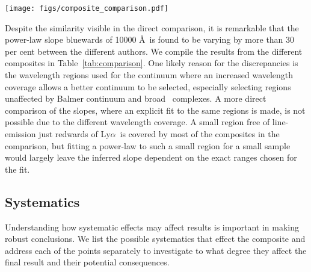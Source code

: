 \documentclass{aa}    %
\newcommand{\figlabel}[1]{\label{fig:#1}}
\newcommand{\Tab}[1]{Table~\ref{tab:#1}}
\newcommand{\tab}[1]{\Tab{#1}}
\newcommand{\sectlabel}[1]{\label{sect:#1}}
\newcommand{\lya}{Ly$\alpha$}
\newcommand{\feii}{\ion{Fe}{ii}}
\begin{document}
 \begin{figure*}[t!]
   \centering
   \texttt{[image: figs/composite\_comparison.pdf]}
   \caption[]{Comparison of different composites. The composites by
     \citet{Lusso2015, VandenBerk2001, Telfer2002, Francis1991} are
     normalized to the X-shooter composite at $\sim 1450$ \AA~and the
     composite by \citet{Glikman2006} is normalized to ours at $\sim
     3850$ \AA. Significant differences are visible blueward of
     \lya~due to differing IGM correction methods. Above 5000 \AA~
     significant host galaxy contamination is visible in the composite
     by \citet{VandenBerk2001}. Overplot in blue is a pure power law
     with slope $\alpha_\lambda = -1.70$ and normalized at $\sim 1450$ \AA.}
   \figlabel{composite_comparison}
 \end{figure*}
  
 
Despite the similarity visible in the direct comparison, it is
remarkable that the power-law slope bluewards of 10000 \AA~is found to
be varying by more than 30 per cent between the different authors. We
compile the results from the different composites in
\tab{comparison}. One likely reason for the discrepancies is the
wavelength regions used for the continuum where an increased
wavelength coverage allows a better continuum to be selected,
especially selecting regions unaffected by Balmer continuum and broad
\feii~complexes. A more direct comparison of the slopes, where an
explicit fit to the same regions is made, is not possible due to the
different wavelength coverage. A small region free of line-emission just redwards of \lya~is covered by most of the composites in the comparison, but fitting a power-law to such a small region for a small sample would largely leave the inferred slope dependent on the exact ranges chosen for the fit.





\subsection{Systematics}  \sectlabel{systematics}

Understanding how systematic effects may affect results is important in making
robust conclusions.
 We list the possible systematics that effect the composite and address each of
the points separately to investigate to what degree they affect the final result
and their potential consequences.
\end{document}
